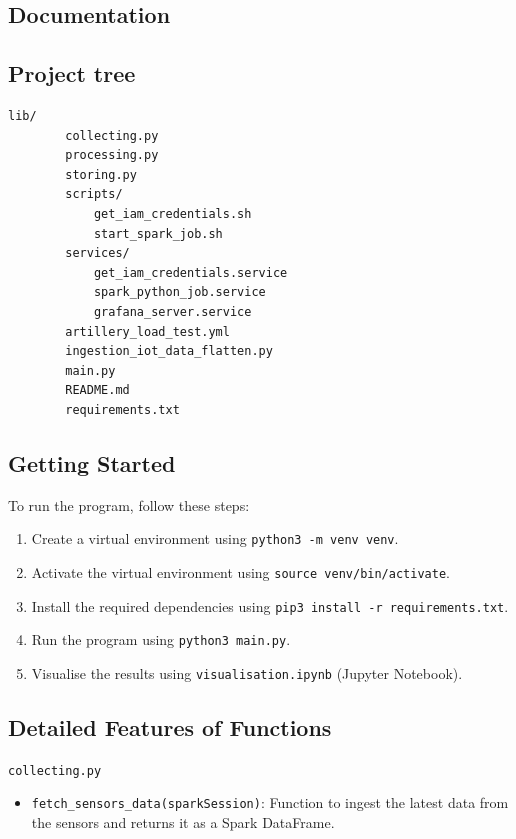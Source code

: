 \documentclass[12pt,oneside]{book} %
\begin{document}



\appendix
\begin{appendices}
    \chapter{Documentation}
    \begin{subappendices}
        \section{Project tree}
        \begin{lstlisting}[breaklines=true, basicstyle=\small]
        lib/
        collecting.py
        processing.py
        storing.py
        scripts/
            get_iam_credentials.sh
            start_spark_job.sh
        services/
            get_iam_credentials.service
            spark_python_job.service
            grafana_server.service
        artillery_load_test.yml
        ingestion_iot_data_flatten.py
        main.py
        README.md
        requirements.txt
        \end{lstlisting}

        \section{Getting Started}
        To run the program, follow these steps:
        \begin{enumerate}
            \itemindent=17.87pt
            \item Create a virtual environment using \texttt{python3 -m venv venv}.
            \item Activate the virtual environment using \texttt{source venv/bin/activate}.
            \item Install the required dependencies using \texttt{pip3 install -r
                      requirements.txt}.
            \item Run the program using \texttt{python3 main.py}.
            \item Visualise the results using \texttt{visualisation.ipynb} (Jupyter Notebook).
        \end{enumerate}

        \section{Detailed Features of Functions}
        \begin{description}
            \item \texttt{collecting.py}
                  \begin{itemize}
                      \item \texttt{fetch\_sensors\_data(sparkSession)}: Function to ingest the latest data from the sensors and returns it as a Spark DataFrame.
                  \end{itemize}


\end{description}
\end{subappendices}
\end{appendices}
\end{document}
